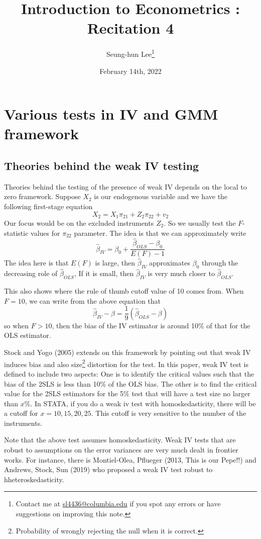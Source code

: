 \documentclass[12pt]{article}
\title{Introduction to Econometrics \ROM{2}: Recitation 4}
\theoremstyle{definition}
\theoremstyle{property}
\theoremstyle{assumption}
\theoremstyle{example}
\theoremstyle{comment}
\begin{document}
\linespread{1.25}
\onehalfspacing

\author{Seung-hun Lee\footnote{Contact me at \href{mailto:sl4436@columbia.edu}{sl4436@columbia.edu} if you spot any errors or have suggestions on improving this note.}}
\date{February 14th, 2022}
\maketitle
\thispagestyle{firstpage}

\section{Various tests in IV and GMM framework}
\subsection{Theories behind the weak IV testing}
Theories behind the testing of the presence of weak IV depends on the local to zero framework. Suppose $X_2$ is our endogenous variable and we have the following first-stage equation
\[
X_2 = X_1\pi_{21}+Z_2\pi_{22}+v_2
\]
Our focus would be on the excluded instruments $Z_2$. So we usually test the $F$-statistic values for $\pi_{22}$ parameter. The idea is that we can approximately write
\[
\hat{\beta}_{IV}=\beta_0+\frac{\hat{\beta}_{OLS}-\beta_0}{E(F)-1}
\]
The idea here is that $E(F)$ is large, then $\hat{\beta}_{IV}$ approximates $\beta_0$ through the decreasing role of $\hat{\beta}_{OLS}$, If it is small, then $\hat{\beta}_{IV}$ is very much closer to $\hat{\beta}_{OLS}$. 
\par
This also shows where the rule of thumb cutoff value of 10 comes from. When $F=10$, we can write from the above equation that
\[
\hat{\beta}_{IV}-\beta = \frac{1}{9}(\hat{\beta}_{OLS}-\beta)
\]
so when $F>10$, then the bias of the IV estimator is around 10\% of that for the OLS estimator. 
\par
Stock and Yogo (2005) extends on this framework by pointing out that weak IV induces bias and also size\footnote{Probability of wrongly rejecting the null when it is correct.} distortion for the test. In this paper, weak IV test is defined to include two aspects: One is to identify the critical values such that the bias of the 2SLS is less than 10\% of the OLS bias. The other is to find the critical value for the 2SLS estimators for the 5\% test that will have a test size no larger than $x$\%. In STATA, if you do a weak iv test with homoskedasticity, there will be a cutoff for $x=10,15,20,25$. This cutoff is very sensitive to the number of the instruments. 
\par
Note that the above test assumes homoskedasticity. Weak IV tests that are robust to assumptions on the error variances are very much dealt in frontier works. For instance, there is Montiel-Olea, Pflueger (2013, This is our Pepe!!) and Andrews, Stock, Sun (2019) who proposed a weak IV test robust to hheteroskedasticity.
\end{document}
